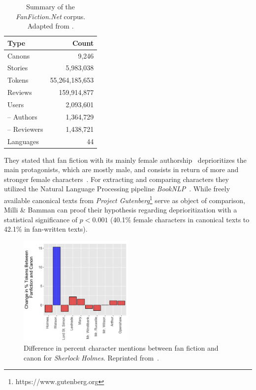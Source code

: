 \begin{table}[ht]
    \centering
    \begin{tabular}{lr}
        \toprule
        \textbf{Type} & \textbf{Count} \\
        \midrule
        Canons        & 9,246          \\
        Stories       & 5,983,038      \\
        Tokens        & 55,264,185,653 \\
        Reviews       & 159,914,877    \\
        Users         & 2,093,601      \\
        – Authors     & 1,364,729      \\
        – Reviewers   & 1,438,721      \\
        Languages     & 44             \\
        \bottomrule
    \end{tabular}
    \caption[Summary of the \emph{FanFiction.Net} corpus.]{Summary of the \emph{FanFiction.Net} corpus.
    Adapted from \citet[p.~2049]{Milli2016BeyondFanfiction}.}
    \label{tab:milli_2016_corpus_summary}
\end{table}
They stated that fan fiction with its mainly female authorship~\citep{Duggan2020WhoAO3, Barnes2015FanfictionFiction} deprioritizes the main protagonists, which are mostly male, and consists in return of more and stronger female characters~\citep{Handley2012DistressingFanfiction, Scodari2000CreatingOnline, Leow2011SubvertingFiction, Busse2009InIntroduction}.
For extracting and comparing characters they utilized the Natural Language Processing pipeline \emph{BookNLP}~\citep{Bamman2014ACharacter}.
While freely available canonical texts from \emph{Project Gutenberg}\footnote{https://www.gutenberg.org} serve as object of comparison, Milli \& Bamman can proof their hypothesis regarding deprioritization with a statistical significance of $p < 0.001$ (40.1\% female characters in canonical texts to 42.1\% in fan-written texts).
\begin{figure}
    \centering
    \includegraphics[width=0.5\textwidth]{figures/milli_2016_sherlock_holmes}
    \caption[Difference in percent character mentions between fan fiction and canon for \emph{Sherlock Holmes}.]{Difference in percent character mentions between fan fiction and canon for \emph{Sherlock Holmes}.
    Reprinted from~\cite[p.~2049]{Milli2016BeyondFanfiction}.}
    \label{fig:milli_2016_sherlock_holmes}
\end{figure}

